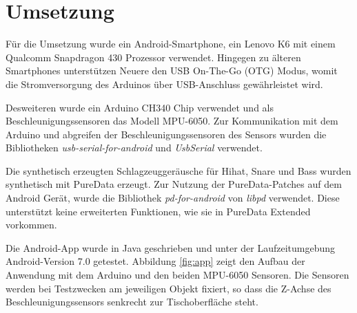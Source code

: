 \section{Umsetzung}
Für die Umsetzung wurde ein Android-Smartphone, ein Lenovo K6 mit einem Qualcomm Snapdragon 430 Prozessor \cite{qualcomm} verwendet.
Hingegen zu älteren Smartphones unterstützen Neuere den USB On-The-Go (OTG) Modus, womit die Stromversorgung des Arduinos über USB-Anschluss gewährleistet wird.

Desweiteren wurde ein Arduino CH340 Chip verwendet und als Beschleunigungssensoren das Modell MPU-6050.
Zur Kommunikation mit dem Arduino und abgreifen der Beschleunigungssensoren des Sensors wurden die Bibliotheken \textit{usb-serial-for-android} \cite{mik3y} und \textit{UsbSerial} \cite{felHR85} verwendet.

Die synthetisch erzeugten Schlagzeuggeräusche für Hihat, Snare und Bass wurden synthetisch mit PureData \cite{puredata} erzeugt. 
Zur Nutzung der PureData-Patches auf dem Android Gerät, wurde die Bibliothek \textit{pd-for-android} \cite{pdAndroid} von \textit{libpd} verwendet.
Diese unterstützt keine erweiterten Funktionen, wie sie in PureData Extended vorkommen.

Die Android-App wurde in Java geschrieben und unter der Laufzeitumgebung Android-Version 7.0 getestet.
Abbildung \ref{fig:app} zeigt den Aufbau der Anwendung mit dem Arduino und den beiden MPU-6050 Sensoren.
Die Sensoren werden bei Testzwecken am jeweiligen Objekt fixiert, so dass die Z-Achse des Beschleunigungssensors senkrecht zur Tischoberfläche steht.


